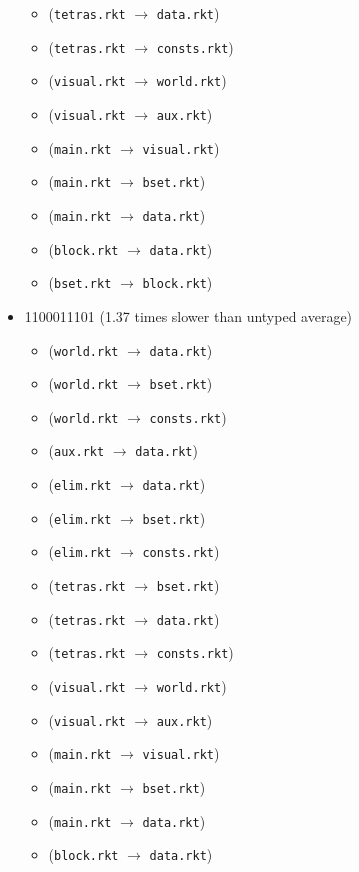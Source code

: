 \documentclass{article}
\newcommand{\mono}[1]{\texttt{#1}}
\begin{document}
\begin{itemize}
\begin{itemize}
  \item (\mono{tetras.rkt} $\rightarrow$ \mono{data.rkt})
  \item (\mono{tetras.rkt} $\rightarrow$ \mono{consts.rkt})
  \item (\mono{visual.rkt} $\rightarrow$ \mono{world.rkt})
  \item (\mono{visual.rkt} $\rightarrow$ \mono{aux.rkt})
  \item (\mono{main.rkt} $\rightarrow$ \mono{visual.rkt})
  \item (\mono{main.rkt} $\rightarrow$ \mono{bset.rkt})
  \item (\mono{main.rkt} $\rightarrow$ \mono{data.rkt})
  \item (\mono{block.rkt} $\rightarrow$ \mono{data.rkt})
  \item (\mono{bset.rkt} $\rightarrow$ \mono{block.rkt})
  \end{itemize}
\item 1100011101 (1.37 times slower than untyped average)
  \begin{itemize}
  \item (\mono{world.rkt} $\rightarrow$ \mono{data.rkt})
  \item (\mono{world.rkt} $\rightarrow$ \mono{bset.rkt})
  \item (\mono{world.rkt} $\rightarrow$ \mono{consts.rkt})
  \item (\mono{aux.rkt} $\rightarrow$ \mono{data.rkt})
  \item (\mono{elim.rkt} $\rightarrow$ \mono{data.rkt})
  \item (\mono{elim.rkt} $\rightarrow$ \mono{bset.rkt})
  \item (\mono{elim.rkt} $\rightarrow$ \mono{consts.rkt})
  \item (\mono{tetras.rkt} $\rightarrow$ \mono{bset.rkt})
  \item (\mono{tetras.rkt} $\rightarrow$ \mono{data.rkt})
  \item (\mono{tetras.rkt} $\rightarrow$ \mono{consts.rkt})
  \item (\mono{visual.rkt} $\rightarrow$ \mono{world.rkt})
  \item (\mono{visual.rkt} $\rightarrow$ \mono{aux.rkt})
  \item (\mono{main.rkt} $\rightarrow$ \mono{visual.rkt})
  \item (\mono{main.rkt} $\rightarrow$ \mono{bset.rkt})
  \item (\mono{main.rkt} $\rightarrow$ \mono{data.rkt})
  \item (\mono{block.rkt} $\rightarrow$ \mono{data.rkt})

\end{itemize}
\end{itemize}
\end{document}
